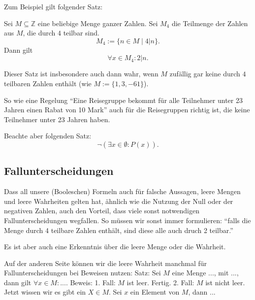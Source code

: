 \documentclass[a4paper]{amsart}
\theoremstyle{definition}
\newcommand{\Z}{\ensuremath{\mathbb{ Z }}}
\begin{document}
Zum Beispiel gilt folgender Satz:

Sei $M \subseteq \Z$ eine beliebige Menge ganzer Zahlen. Sei $M_4$ die Teilmenge der Zahlen aus $M$, die durch $4$ teilbar sind.
\begin{equation}
   M_4 := \{ n \in M \mid 4 |n \}.
\end{equation}
Dann gilt
\begin{equation}
  \forall x \in M_4 \colon 2 | n.
\end{equation}

Dieser Satz ist insbesondere auch dann wahr, wenn $M$ zufällig gar keine durch $4$ teilbaren Zahlen enthält (wie $M := \{ 1, 3, -61 \}$).

So wie eine Regelung "`Eine Reisegruppe bekommt für alle Teilnehmer unter 23 Jahren einen Rabat von 10 Mark"' auch für die Reisegruppen richtig ist, die keine Teilnehmer unter 23 Jahren haben.

Beachte aber folgenden Satz:
\begin{equation}
   \neg \left( \exists x \in \emptyset \colon P(x) \right).
\end{equation}

\subsection{Fallunterscheidungen}
Dass all unsere (Booleschen) Formeln auch für falsche Aussagen, leere Mengen und leere Wahrheiten gelten hat, ähnlich wie die Nutzung der Null oder der negativen Zahlen, auch den Vorteil, dass viele sonst notwendigen Fallunterscheidungen wegfallen. So müssen wir sonst immer formulieren: "`falls die Menge durch 4 teilbare Zahlen enthält, sind diese alle auch druch 2 teilbar."'

Es ist aber auch eine Erkenntnis über die leere Menge oder die Wahrheit.

Auf der anderen Seite können wir die leere Wahrheit manchmal für Fallunterscheidungen bei Beweisen nutzen: Satz: Sei $M$ eine Menge ..., mit ..., dann gilt $\forall x \in M \colon ...$. Beweis: 1. Fall: $M$ ist leer. Fertig. 2. Fall: $M$ ist nicht leer. Jetzt wissen wir es gibt ein $X \in M$. Sei $x$ ein Element von $M$, dann ...

\end{document}
